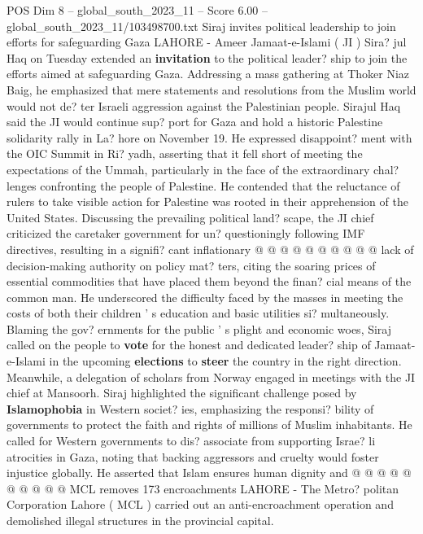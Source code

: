 \begin{textsample}{POS Dim 8 – global\_south\_2023\_11 – Score 6.00 – global\_south\_2023\_11/103498700.txt}  \label{ex:f8_pos_277}
Siraj invites political leadership to join efforts for safeguarding Gaza LAHORE - Ameer Jamaat-e-Islami ( JI ) Sira? jul Haq on Tuesday extended an \textbf{invitation} to the political leader? ship to join the efforts aimed at safeguarding Gaza.
Addressing a mass gathering at Thoker Niaz Baig, he emphasized that mere statements and resolutions from the Muslim world would not de? ter Israeli aggression against the Palestinian people.
Sirajul Haq said the JI would continue sup? port for Gaza and hold a historic Palestine solidarity rally in La? hore on November 19.
He expressed disappoint? ment with the OIC Summit in Ri? yadh, asserting that it fell short of meeting the expectations of the Ummah, particularly in the face of the extraordinary chal? lenges confronting the people of Palestine.
He contended that the reluctance of rulers to take visible action for Palestine was rooted in their apprehension of the United States.
Discussing the prevailing political land? scape, the JI chief criticized the caretaker government for un? questioningly following IMF directives, resulting in a signifi? cant inflationary @ @ @ @ @ @ @ @ @ @ lack of decision-making authority on policy mat? ters, citing the soaring prices of essential commodities that have placed them beyond the finan? cial means of the common man.
He underscored the difficulty faced by the masses in meeting the costs of both their children ' s education and basic utilities si? multaneously.
Blaming the gov? ernments for the public ' s plight and economic woes, Siraj called on the people to \textbf{vote} for the honest and dedicated leader? ship of Jamaat-e-Islami in the upcoming \textbf{elections} to \textbf{steer} the country in the right direction.
Meanwhile, a delegation of scholars from Norway engaged in meetings with the JI chief at Mansoorh.
Siraj highlighted the significant challenge posed by \textbf{Islamophobia} in Western societ? ies, emphasizing the responsi? bility of governments to protect the faith and rights of millions of Muslim inhabitants.
He called for Western governments to dis? associate from supporting Israe? li atrocities in Gaza, noting that backing aggressors and cruelty would foster injustice globally.
He asserted that Islam ensures human dignity and @ @ @ @ @ @ @ @ @ @ MCL removes 173 encroachments LAHORE - The Metro? politan Corporation Lahore ( MCL ) carried out an anti-encroachment operation and demolished illegal structures in the provincial capital.

\end{textsample}
